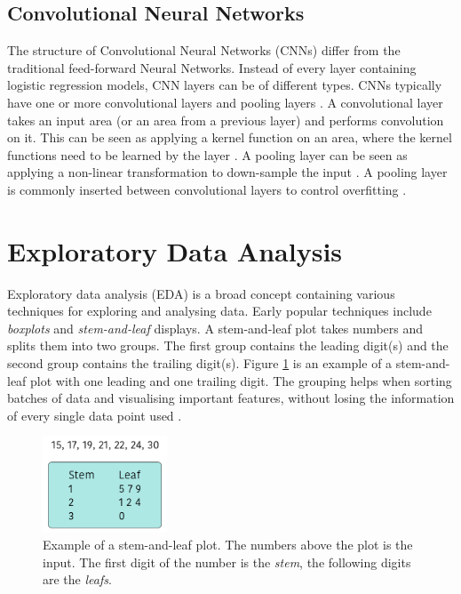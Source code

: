 \subsection{Convolutional Neural Networks}
\label{sec:cnn}
The structure of Convolutional Neural Networks (CNNs) differ from the traditional feed-forward Neural Networks.
Instead of every layer containing logistic regression models, CNN layers can be of different types.
CNNs typically have one or more convolutional layers and pooling layers \cite{LeCun1995}.
A convolutional layer takes an input area (or an area from a previous layer) and performs convolution on it.
This can be seen as applying a kernel function on an area, where the kernel functions need to be learned by the layer \cite{Krizhevsky2012}.
A pooling layer can be seen as applying a non-linear transformation to down-sample the input \cite{LeCun1995}.
A pooling layer is commonly inserted between convolutional layers to control overfitting \cite{Krizhevsky2012}.


\section{Exploratory Data Analysis}
Exploratory data analysis (EDA) is a broad concept containing various techniques \cite{Anselin1999, Gelman2003, Hoaglin2003, Tukey1977, Velleman1981} for exploring and analysing data.
Early popular techniques include \emph{boxplots} and \emph{stem-and-leaf} displays.
A stem-and-leaf plot takes numbers and splits them into two groups.
The first group contains the leading digit(s) and the second group contains the trailing digit(s).
Figure \ref{fig:stem-leaf-plot} is an example of a stem-and-leaf plot with one leading and one trailing digit.
The grouping helps when sorting batches of data and visualising important features, without losing the information of every single data point used \cite{Velleman1981}.

\begin{figure} [h!]
  \centering
    \includegraphics[width=0.33\textwidth]{figures/stem-leaf-plot}
  \caption{Example of a stem-and-leaf plot. The numbers above the plot is the input.
  The first digit of the number is the \emph{stem}, the following digits are the \emph{leafs}.}
  \label{fig:stem-leaf-plot}
\end{figure}


